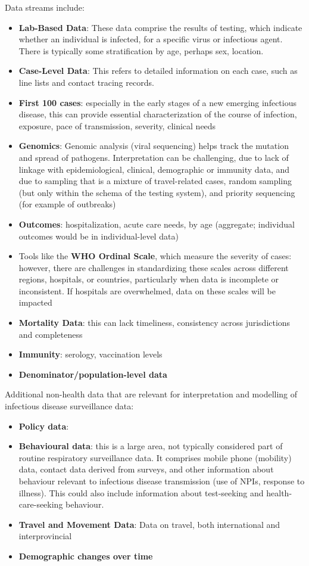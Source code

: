 Data streams include:
\begin{itemize}
\item \textbf{Lab-Based Data}: These data comprise the results of testing, which indicate whether an individual is infected, for a specific virus or infectious agent. There is typically some stratification by age, perhaps sex, location. 
\item \textbf{Case-Level Data}: This refers to detailed information on each case, such as line lists and contact tracing records.
\item \textbf{First 100 cases}: especially in the early stages of a new emerging infectious disease, this can provide essential characterization of the course of infection, exposure, pace of transmission, severity, clinical needs
\item \textbf{Genomics}: Genomic analysis (viral sequencing) helps track the mutation and spread of pathogens. Interpretation can be challenging, due to lack of linkage with epidemiological, clinical, demographic or immunity data, and due to sampling that is a mixture of travel-related cases, random sampling (but only within the schema of the testing system), and priority sequencing (for example of outbreaks)
\item \textbf{Outcomes}: hospitalization, acute care needs, by age (aggregate; individual outcomes would be in individual-level data) 
\item Tools like the \textbf{WHO Ordinal Scale}, which measure the severity of cases: however, there are challenges in standardizing these scales across different regions, hospitals, or countries, particularly when data is incomplete or inconsistent. If hospitals are overwhelmed, data on these scales will be impacted 
\item \textbf{Mortality Data}: this can lack timeliness, consistency across jurisdictions and completeness
\item \textbf{Immunity}: serology, vaccination levels
\item \textbf{Denominator/population-level data}
\end{itemize}


Additional non-health data that are relevant for interpretation and modelling of infectious disease surveillance data: 
\begin{itemize}
\item  \textbf{Policy data}:
\item \textbf{Behavioural data}: this is a large area, not typically considered part of routine respiratory surveillance data. It comprises mobile phone  (mobility) data, contact data derived from surveys, and other information about behaviour relevant to infectious disease transmission (use of NPIs, response to illness). This could also include information about test-seeking and health-care-seeking behaviour. 
\item \textbf{Travel and Movement Data}: Data on travel, both international and interprovincial
\item \textbf{Demographic changes over time}
\end{itemize}

